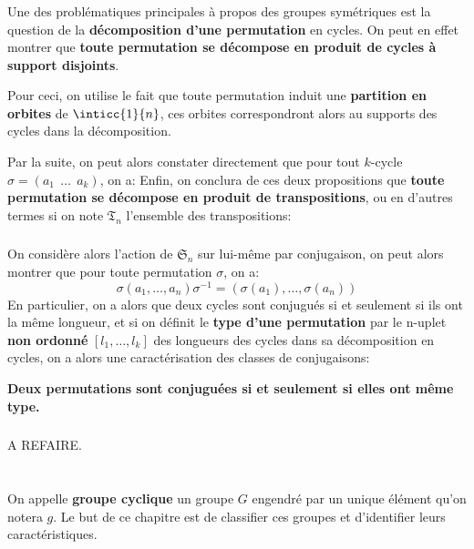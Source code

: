 \subsection*{}
Une des problématiques principales à propos des groupes symétriques est la question de la \textbf{décomposition d'une permutation} en cycles. On peut en effet montrer que \textbf{toute permutation se décompose en produit de cycles à support disjoints}.\<

Pour ceci, on utilise le fait que toute permutation induit une \textbf{partition en orbites} de \( \inticc{1}{n} \), ces orbites correspondront alors au supports des cycles dans la décomposition.\<

Par la suite, on peut alors constater directement que pour tout \(k\)-cycle \(\sigma = (a_1 \;\, \ldots \;\, a_k)\), on a:
Enfin, on conclura de ces deux propositions que \textbf{toute permutation se décompose en produit de transpositions}, ou en d'autres termes si on note \(\mathfrak{T}_n\) l'ensemble des transpositions:
\subsection*{}
On considère alors l'action de \(  \mathfrak{S}_n \) sur lui-même par conjugaison, on peut alors montrer que pour toute permutation \(\sigma\), on a:
\[ 
   \sigma(a_1, \ldots, a_n)\sigma^{-1} = (\sigma(a_1), \ldots, \sigma(a_n))
\]
En particulier, on a alors que deux cycles sont conjugués si et seulement si ils ont la même longueur, et si on définit le \textbf{type d'une permutation} par le n-uplet \textbf{non ordonné} \( [l_1, \ldots, l_k] \) des longueurs des cycles dans sa décomposition en cycles, on a alors une caractérisation des classes de conjugaisons:
\begin{center}
   \textbf{Deux permutations sont conjuguées si et seulement si elles ont même type.}
\end{center}

\subsection*{}
A REFAIRE.
\chapter*{}
On appelle \textbf{groupe cyclique} un groupe \(G\) engendré par un unique élément qu'on notera \(g\). Le but de ce chapitre est de classifier ces groupes et d'identifier leurs caractéristiques.\<

